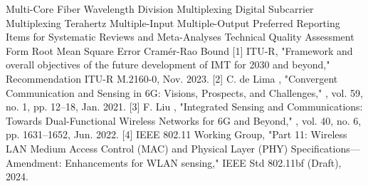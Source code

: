 {}\markdownRendererPipe{}  \markdownRendererPipe{} Multi-Core Fiber \markdownRendererPipe{}\markdownRendererSoftLineBreak
{}\markdownRendererPipe{}  \markdownRendererPipe{} Wavelength Division Multiplexing \markdownRendererPipe{}\markdownRendererSoftLineBreak
{}\markdownRendererPipe{}  \markdownRendererPipe{} Digital Subcarrier Multiplexing \markdownRendererPipe{}\markdownRendererSoftLineBreak
{}\markdownRendererPipe{}  \markdownRendererPipe{} Terahertz \markdownRendererPipe{}\markdownRendererSoftLineBreak
{}\markdownRendererPipe{}  \markdownRendererPipe{} Multiple-Input Multiple-Output \markdownRendererPipe{}\markdownRendererSoftLineBreak
{}\markdownRendererPipe{}  \markdownRendererPipe{} Preferred Reporting Items for Systematic Reviews and Meta-Analyses \markdownRendererPipe{}\markdownRendererSoftLineBreak
{}\markdownRendererPipe{}  \markdownRendererPipe{} Technical Quality Assessment Form \markdownRendererPipe{}\markdownRendererSoftLineBreak
{}\markdownRendererPipe{}  \markdownRendererPipe{} Root Mean Square Error \markdownRendererPipe{}\markdownRendererSoftLineBreak
{}\markdownRendererPipe{}  \markdownRendererPipe{} Cramér-Rao Bound \markdownRendererPipe{}\markdownRendererInterblockSeparator
{}\markdownRendererThematicBreak{}\markdownRendererInterblockSeparator
{}
\markdownRendererSectionEnd 
\markdownRendererSectionEnd 
\markdownRendererSectionEnd \markdownRendererSectionBegin
{}\markdownRendererInterblockSeparator
{}[1] ITU-R, "Framework and overall objectives of the future development of IMT for 2030 and beyond," Recommendation ITU-R M.2160-0, Nov. 2023.\markdownRendererParagraphSeparator
{}[2] C. de Lima , "Convergent Communication and Sensing in 6G: Visions, Prospects, and Challenges," , vol. 59, no. 1, pp. 12–18, Jan. 2021.\markdownRendererParagraphSeparator
{}[3] F. Liu , "Integrated Sensing and Communications: Towards Dual-Functional Wireless Networks for 6G and Beyond," , vol. 40, no. 6, pp. 1631–1652, Jun. 2022.\markdownRendererParagraphSeparator
{}[4] IEEE 802.11 Working Group, "Part 11: Wireless LAN Medium Access Control (MAC) and Physical Layer (PHY) Specifications—Amendment: Enhancements for WLAN sensing," IEEE Std 802.11bf (Draft), 2024.\markdownRendererParagraphSeparator
